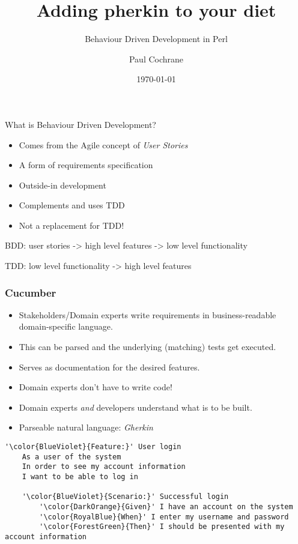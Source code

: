 \documentclass[10pt]{vcs_beamer}
\begin{document}
\author{Paul Cochrane}
\title{Adding pherkin to your diet}
\subtitle{Behaviour Driven Development in Perl}
\date{\today}

\maketitle

\begin{frame}{What is Behaviour Driven Development?}

\begin{itemize}
    \item Comes from the Agile concept of \emph{User Stories}
    \item A form of requirements specification
    \item Outside-in development
    \item Complements and uses TDD
    \item Not a replacement for TDD!
\end{itemize}

BDD: user stories -> high level features -> low level functionality

TDD: low level functionality -> high level features

\end{frame}

\begin{frame}[fragile]
    \frametitle{Cucumber}

\begin{itemize}
    \item Stakeholders/Domain experts write requirements in business-readable
        domain-specific language.
    \item This can be parsed and the underlying (matching) tests get executed.
    \item Serves as documentation for the desired features.
    \item Domain experts don't have to write code!
    \item Domain experts \emph{and} developers understand what is to be built.
    \item Parseable natural language: \emph{Gherkin}
\end{itemize}

\begin{lstlisting}[escapeinside='']
'\color{BlueViolet}{Feature:}' User login
    As a user of the system
    In order to see my account information
    I want to be able to log in

    '\color{BlueViolet}{Scenario:}' Successful login
        '\color{DarkOrange}{Given}' I have an account on the system
        '\color{RoyalBlue}{When}' I enter my username and password
        '\color{ForestGreen}{Then}' I should be presented with my account information
\end{lstlisting}
\end{frame}
\end{document}
